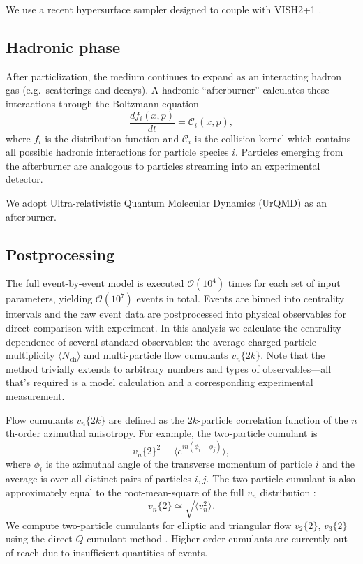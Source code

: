 \documentclass[aps,prc,reprint,superscriptaddress,amsmath]{revtex4-1}
\newcommand{\avg}[1]{\langle #1 \rangle}
\newcommand{\nch}{N_\text{ch}}
\newcommand{\vnk}[2]{v_#1\{#2\}}
\newcommand{\order}[1]{$\mathcal O(10^{#1})$}
\begin{document}
We use a recent hypersurface sampler designed to couple with \small{VISH2+1} \cite{Qiu:2013wca,Shen:2014vra}.

\subsection{Hadronic phase}

After particlization, the medium continues to expand as an interacting hadron gas (e.g.\ scatterings and decays).
A hadronic ``afterburner'' calculates these interactions through the Boltzmann equation
\begin{equation}
  \frac{df_i(x,p)}{dt} = \mathcal C_i(x,p),
\end{equation}
where $f_i$ is the distribution function and $\mathcal C_i$ is the collision kernel which contains all possible hadronic interactions for particle species $i$.
Particles emerging from the afterburner are analogous to particles streaming into an experimental detector.

We adopt Ultra-relativistic Quantum Molecular Dynamics (UrQMD) \cite{Bass:1998ca,Bleicher:1999xi} as an afterburner.

\subsection{Postprocessing}

The full event-by-event model is executed \order 4 times for each set of input parameters, yielding \order 7 events in total.
Events are binned into centrality intervals and the raw event data are postprocessed into physical observables for direct comparison with experiment.
In this analysis we calculate the centrality dependence of several standard observables:
the average charged-particle multiplicity $\avg\nch$ and multi-particle flow cumulants $\vnk n {2k}$.
Note that the method trivially extends to arbitrary numbers and types of observables---all that's required is a model calculation and a corresponding experimental measurement.

Flow cumulants $\vnk n {2k}$ are defined as the $2k$-particle correlation function of the $n$th-order azimuthal anisotropy.
For example, the two-particle cumulant is
\begin{equation}
  \vnk n 2^2 \equiv \bigl\langle e^{in(\phi_i - \phi_j)} \bigr\rangle,
\end{equation}
where $\phi_i$ is the azimuthal angle of the transverse momentum of particle $i$ and the average is over all distinct pairs of particles $i,j$.
The two-particle cumulant is also approximately equal to the root-mean-square of the full $v_n$ distribution \cite{Borghini:2000sa}:
\begin{equation}
  \vnk n 2 \simeq \sqrt{\avg{v_n^2}}.
\end{equation}
We compute two-particle cumulants for elliptic and triangular flow $\vnk 2 2$, $\vnk 3 2$ using the direct $Q$-cumulant method \cite{Bilandzic:2010jr}.
Higher-order cumulants are currently out of reach due to insufficient quantities of events.
\end{document}
